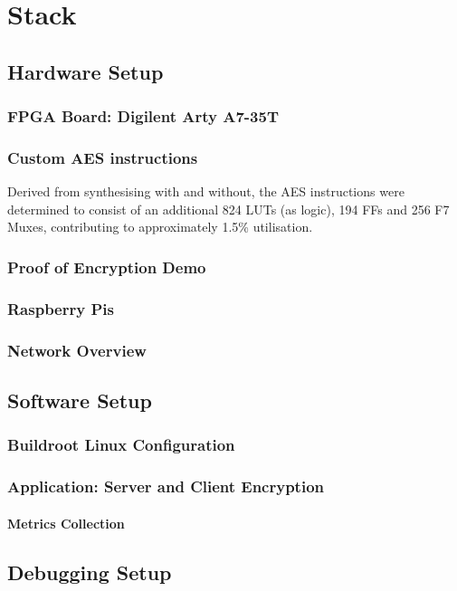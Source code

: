 \chapter[Stack]{Stack}
\label{Chap:Stack}


\section{Hardware Setup}

\subsection{FPGA Board: Digilent Arty A7-35T}

\subsection{Custom AES instructions}
Derived from synthesising with and without, the AES instructions were determined to consist of an additional 824 LUTs (as logic), 194 FFs and 256 F7 Muxes, contributing to approximately 1.5\% utilisation.



\subsection{Proof of Encryption Demo}

\subsection{Raspberry Pis}

\subsection{Network Overview}

\newpage
\section{Software Setup}

\subsection{Buildroot Linux Configuration}

\subsection{Application: Server and Client Encryption}

\subsubsection{Metrics Collection}

\section{Debugging Setup}
